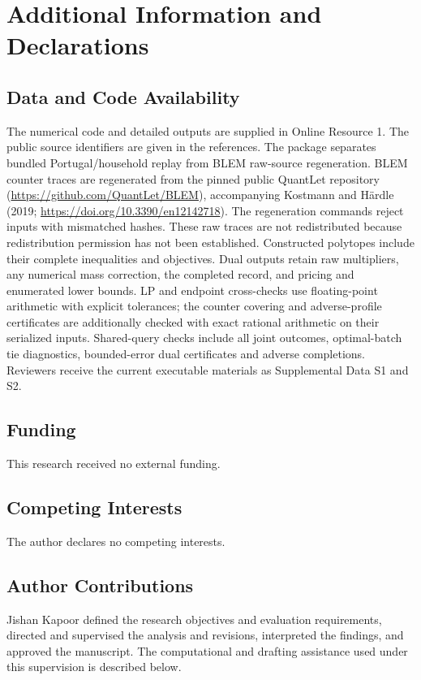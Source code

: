 \documentclass[12pt]{article}
\begin{document}
\section*{Additional Information and Declarations}
\subsection*{Data and Code Availability}
The numerical code and detailed outputs are supplied in Online Resource 1.
The public source identifiers are given in the references. The package
separates bundled Portugal/household replay from BLEM raw-source
regeneration. BLEM counter traces are regenerated from the pinned public
QuantLet repository (\url{https://github.com/QuantLet/BLEM}), accompanying
Kostmann and H\"ardle (2019; \url{https://doi.org/10.3390/en12142718}).
The regeneration commands reject inputs with mismatched hashes.
These raw traces are not redistributed because redistribution permission
has not been established.
Constructed polytopes include their complete inequalities and objectives.
Dual outputs retain raw multipliers, any numerical mass correction, the
completed record, and pricing and enumerated lower bounds. LP and endpoint
cross-checks use floating-point arithmetic with explicit tolerances; the
counter covering and adverse-profile certificates are additionally checked
with exact rational arithmetic on their serialized inputs. Shared-query
checks include all joint outcomes, optimal-batch tie diagnostics, bounded-error
dual certificates and adverse completions. Reviewers receive the current
executable materials as Supplemental Data S1 and S2.

\subsection*{Funding}
This research received no external funding.

\subsection*{Competing Interests}
The author declares no competing interests.

\subsection*{Author Contributions}
Jishan Kapoor defined the research objectives and evaluation requirements,
directed and supervised the analysis and revisions, interpreted the findings,
and approved the manuscript. The computational and drafting assistance used
under this supervision is described below.
\end{document}
